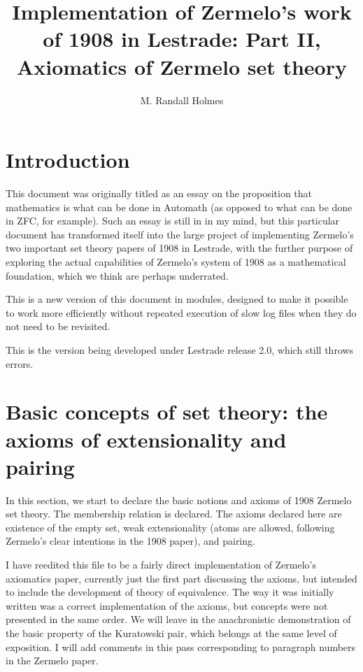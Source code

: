 \documentclass[12pt]{article}
\title{Implementation of Zermelo's work of 1908 in Lestrade:  Part II, Axiomatics of Zermelo set theory}
\author{M. Randall Holmes}
\begin{document}
\maketitle

\section{Introduction}
 
This document was originally titled as an essay on the proposition that mathematics is what can be done in Automath (as opposed to what can be done in ZFC, for example).  Such an essay is still in in my mind, but this particular document has transformed itself into the large project of implementing Zermelo's two important set theory papers of 1908 in Lestrade, with the further purpose of exploring the actual capabilities of Zermelo's system of 1908 as a mathematical foundation, which we think are perhaps underrated.

This is a new version of this document in modules, designed to make it possible to work more efficiently without repeated execution of slow log files when they do not need to be revisited.

This is the version being developed under Lestrade release 2.0, which still throws errors.

\section{Basic concepts of set theory:  the axioms of extensionality and pairing}

In this section, we start to declare the basic notions and axioms of 1908 Zermelo set theory.  The membership relation is declared.  The axioms declared here are existence of the empty set, weak extensionality (atoms are allowed, following Zermelo's clear intentions in the 1908 paper), and pairing.

I have reedited this file to be a fairly direct implementation of Zermelo's axiomatics paper, currently just the first part discussing the axioms, but intended to include the development of theory of equivalence.  The way it was initially written was a correct implementation of the axioms, but concepts were not presented in the same order.  We will leave in the anachronistic demonstration of the basic property of the Kuratowski pair, which belongs at the same level of exposition.  I will add comments in this pass corresponding to paragraph  numbers in the Zermelo paper.
\end{document}
